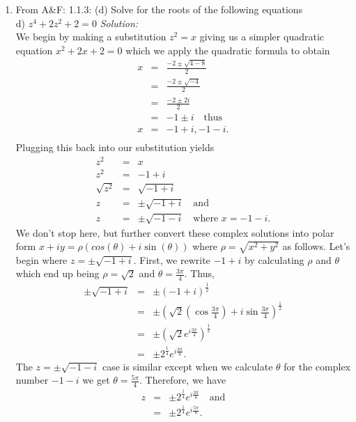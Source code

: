 \documentclass[10pt]{amsart}
\theoremstyle{nonumberplain}
\begin{document}
\begin{enumerate}[label={\bf {\arabic*}:}]
\item From A\&F: 1.1.3: (d)  Solve for the roots of the following equations \\
d) $z^4 + 2z^2 + 2 = 0$ \textit{Solution:} \\
We begin by making a substitution $z^2 = x$ giving us a simpler quadratic equation $x^2 + 2x + 2 = 0$ which we apply the quadratic formula to obtain
\begin{eqnarray*}
x &=& \frac{-2 \pm \sqrt{4 - 8}}{2} \\
   &=& \frac{-2 \pm \sqrt{-4}}{2} \\
   &=& \frac{-2 \pm 2i}{2} \\
   &=& -1 \pm i \quad \text{thus} \\
x &=& -1 + i, -1 - i. \\
\end{eqnarray*}
Plugging this back into our substitution yields
\begin{eqnarray*}
z^2 &=& x \\
z^2 &=& -1 + i \\
\sqrt{z^2} &=& \sqrt{-1 + i} \\
z &=& \pm \sqrt{-1 + i} \quad \text{and} \\
z &=& \pm \sqrt{-1 - i} \quad \text{where $x = -1 - i$}.
\end{eqnarray*}
We don't stop here, but further convert these complex solutions into polar form $x + iy = \rho(cos(\theta) + i\sin(\theta))$ where $\rho = \sqrt{x^2 + y^2}$ as follows. 
Let's begin where $z = \pm \sqrt{-1 + i}$.
First, we rewrite $-1 + i$ by calculating $\rho$ and $\theta$ which end up being $\rho = \sqrt{2}$ and $\theta = \frac{3\pi}{4}$. Thus,
\begin{eqnarray*}
\pm \sqrt{-1 + i} &=& \pm (-1 + i)^\frac{1}{2} \\
			&=& \pm (\sqrt{2}(\cos{\frac{3\pi}{4}}) + i\sin{\frac{3\pi}{4}})^\frac{1}{2} \\
			&=& \pm (\sqrt{2}e^{i \frac{3\pi}{4}})^\frac{1}{2} \\
			&=& \pm 2^{\frac{1}{4}}e^{i \frac{3\pi}{8}}.
\end{eqnarray*}
The $z = \pm \sqrt{-1 -i}$ case is similar except when we calculate $\theta$ for the complex number $ -1 -i $ we get $\theta = \frac{5\pi}{4}$.
Therefore, we have
\begin{eqnarray*}
z &=& \pm 2^{\frac{1}{4}}e^{i \frac{3\pi}{8}} \quad \text{and} \\
   &=& \pm 2^{\frac{1}{4}}e^{i \frac{5\pi}{8}}.
\end{eqnarray*}

\end{enumerate}
\end{document}
